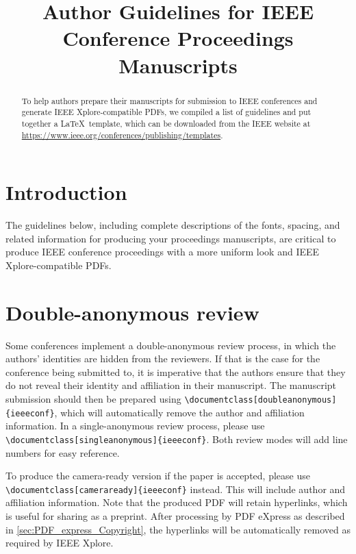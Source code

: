 \documentclass[9pt]{ieeeconf}
\title{Author Guidelines for IEEE Conference Proceedings Manuscripts}
\begin{document}
\maketitle

\begin{abstract}
To help authors prepare their manuscripts for submission to IEEE conferences and generate IEEE Xplore-compatible PDFs, we compiled a list of guidelines and put together a \LaTeX\ template,
which can be downloaded from the IEEE website at \url{https://www.ieee.org/conferences/publishing/templates}. 
\end{abstract}


\section{Introduction}
\label{sec:intro}

The guidelines below, including complete descriptions of the fonts, spacing, and related information for producing your proceedings manuscripts, are critical to produce IEEE conference proceedings with a more uniform look and IEEE Xplore-compatible PDFs.


\section{Double-anonymous review}
\label{sec:double_anonymous}

Some conferences implement a double-anonymous review process, in which the authors' identities are hidden from the reviewers. If that is the case for the conference being submitted to, it is imperative that the authors ensure that they do not reveal their identity and affiliation in their manuscript. The manuscript submission should then be prepared using \texttt{\textbackslash{}documentclass[doubleanonymous]\{ieeeconf\}}, which will automatically remove the author and affiliation information. In a single-anonymous review process, please use \texttt{\textbackslash{}documentclass[singleanonymous]\{ieeeconf\}}. Both review modes will add line numbers for easy reference.

To produce the camera-ready version if the paper is accepted, please use \texttt{\textbackslash{}documentclass[cameraready]\{ieeeconf\}} instead. This will include author and affiliation information. Note that the produced PDF will retain hyperlinks, which is useful for sharing as a preprint. After processing by PDF eXpress as described in \cref{sec:PDF_express_Copyright}, the hyperlinks will be automatically removed as required by IEEE Xplore.
\end{document}

